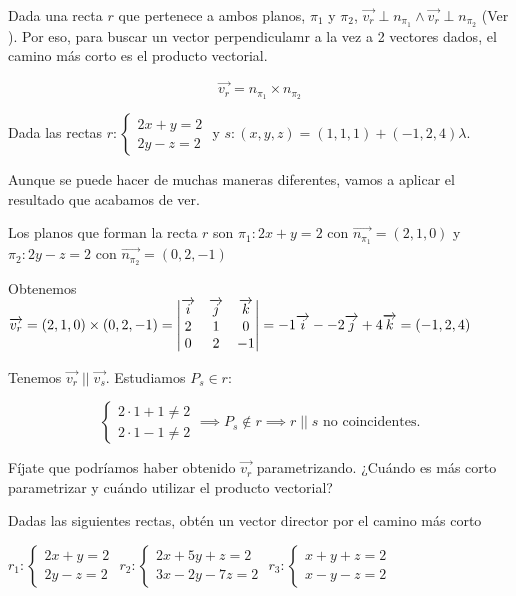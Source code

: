 Dada una recta $r$ que pertenece a ambos planos, $\pi_1$ y $\pi_2$, $\vec{v_r}\perp n_{\pi_1} \wedge \vec{v_r}\perp n_{\pi_2}$ (Ver ).
%
Por eso, para buscar un vector perpendiculamr a la vez a 2 vectores dados, el camino más corto es el producto vectorial.

\[\vec{v_r} = n_{\pi_1}\times n_{\pi_2}\]

\begin{problem}

Dada las rectas $r:\left\{\begin{array}{c}2x+y=2\\2y-z=2\end{array}\right.$ y $s:(x,y,z) = (1,1,1) + (-1,2,4)\lambda$.

\solution

Aunque se puede hacer de muchas maneras diferentes, vamos a aplicar el resultado que acabamos de ver.

Los planos que forman la recta $r$ son $\pi_1: 2x+y=2 \text{ con } \vec{n_{\pi_1}} = (2,1,0)$ y $\pi_2: 2y-z=2 \text{ con } \vec{n_{\pi_2}} = (0,2,-1)$ 

Obtenemos $\vec{v_r} = (2,1,0)\times (0,2,-1) = \crossprodandcalc{2}{1}{0}{0}{2}{-1}$

Tenemos $\vec{v_r} \;||\; \vec{v_s}$. Estudiamos $P_s \in r$:

\[
\left\{\begin{array}{c}2·1+1\neq2\\2·1-1\neq2\end{array}\right. \implies P_s\not\in r\implies r\;||\;s \text{ no coincidentes.}
\]
\end{problem}



\obs Fíjate que podríamos haber obtenido $\vec{v_r}$ parametrizando. ¿Cuándo es más corto parametrizar y cuándo utilizar el producto vectorial?

\begin{problem}
Dadas las siguientes rectas, obtén un vector director por el camino más corto

\ppart $r_1:\left\{\begin{array}{c}2x+y=2\\2y-z=2\end{array}\right.$
\ppart $r_2:\left\{\begin{array}{c}2x+5y+z=2\\3x-2y-7z=2\end{array}\right.$
\ppart $r_3:\left\{\begin{array}{c}x+y+z=2\\x-y-z=2\end{array}\right.$

\solution


\end{problem}


